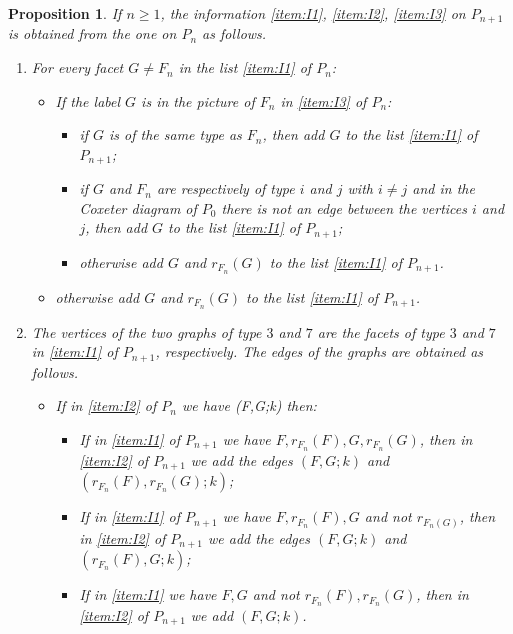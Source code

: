 \documentclass{amsart}
\newtheorem{prop}[lemma]{Proposition}
\theoremstyle{definition}
\theoremstyle{remark}
\begin{document}
\begin{prop}
\label{procedura}
   If $n\ge1$, the information \ref{item:I1},  \ref{item:I2}, \ref{item:I3} on $P_{n+1}$ is obtained from the one on $P_n$ as follows.
    \begin{enumerate}
        \item[\ref{item:I1}] For every facet $G\ne F_n$ in the list \ref{item:I1} of $P_n$:
        \begin{itemize}
            \item If the label $G$  is in the picture of $F_n$ in \ref{item:I3} of $P_n$:
            \begin{itemize}
                \item if $G$ is of the same type as $F_n$, then add $G$ to the list \ref{item:I1} of $P_{n+1}$;
                \item if $G$ and $F_n$ are respectively of type $i$ and $j$ with $i\ne j$ and in the Coxeter diagram of $P_0$ there is not an edge between the vertices $i$ and $j$, then add $G$ to the list \ref{item:I1} of $P_{n+1}$;
                \item otherwise add $G$ and $r_{F_n}(G)$ to the list \ref{item:I1} of $P_{n+1}$.
            \end{itemize}
            \item otherwise add $G$ and $r_{F_n}(G)$ to the list \ref{item:I1} of $P_{n+1}$.
        \end{itemize}
        \item[\ref{item:I2}] The vertices of the two graphs of type $3$ and $7$ are the facets of type $3$ and $7$ in \ref{item:I1} of $P_{n+1}$, respectively. The edges of the graphs are obtained as follows.
        \begin{itemize}
            \item If in \ref{item:I2} of $P_n$ we have (F,G;k) then:
            \begin{itemize}
            \item If in \ref{item:I1} of $P_{n+1}$ we have $F,r_{F_n}(F),G,r_{F_n}(G)$, then in \ref{item:I2} of $P_{n+1}$ we add the edges $(F,G;k)$ and $(r_{F_n}(F),r_{F_n}(G);k)$;
                \item If in \ref{item:I1} of $P_{n+1}$ we have $F,r_{F_n}(F),G$ and not $r_{F_n(G)}$, then in \ref{item:I2} of $P_{n+1}$ we add the edges $(F,G;k)$ and $(r_{F_n}(F),G;k)$;
            \item If in \ref{item:I1} we have $F, G$ and not $r_{F_n}(F),r_{F_n}(G)$, then in \ref{item:I2} of $P_{n+1}$ we add $(F,G;k)$.

\end{itemize}
\end{itemize}
\end{enumerate}
\end{prop}
\end{document}
